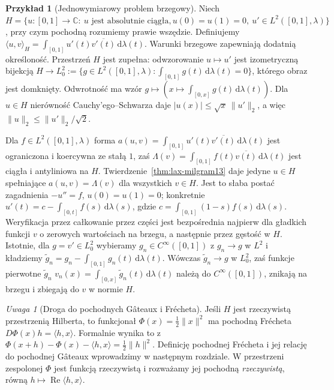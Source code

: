 \documentclass[11pt,a4paper]{article}
\numberwithin{equation}{section}
\theoremstyle{plain}
\theoremstyle{definition}
\newtheorem{przyklad}[twierdzenie]{Przykład}
\theoremstyle{remark}
\newtheorem{uwaga}[twierdzenie]{Uwaga}
\newcommand{\C}{\mathbb C}
\begin{document}
\begin{przyklad}[Jednowymiarowy problem brzegowy]
\label{ex:weak-poisson13}
Niech $H=\{u:[0,1]\to\C:\ u\text{ jest absolutnie ciągła},
u(0)=u(1)=0,\ u'\in L^2([0,1],\lambda)\}$,
przy czym pochodną rozumiemy prawie wszędzie.
Definiujemy $\langle u,v\rangle_H=
\int_{[0,1]}u'(t)\overline{v'(t)}\,\mathrm d\lambda(t)$.
Warunki brzegowe zapewniają dodatnią określoność. Przestrzeń $H$
jest zupełna: odwzorowanie $u\mapsto u'$ jest izometryczną bijekcją
$H\to L^2_0:=\{g\in L^2([0,1],\lambda):
\int_{[0,1]}g(t)\,\mathrm d\lambda(t)=0\}$,
którego obraz jest domknięty. Odwrotność ma wzór
$g\mapsto(x\mapsto\int_{[0,x]}g(t)\,\mathrm d\lambda(t))$.
Dla $u\in H$ nierówność Cauchy'ego--Schwarza daje
$|u(x)|\le\sqrt{x}\,\|u'\|_2$, a więc
$\|u\|_2\le\|u'\|_2/\sqrt2$.

Dla $f\in L^2([0,1],\lambda)$ forma
$a(u,v)=\int_{[0,1]}u'(t)\overline{v'(t)}\,\mathrm d\lambda(t)$
jest ograniczona i koercywna ze stałą $1$, zaś
$\Lambda(v)=\int_{[0,1]}f(t)\overline{v(t)}\,\mathrm d\lambda(t)$
jest ciągła i antyliniowa na $H$.
Twierdzenie~\ref{thm:lax-milgram13} daje jedyne $u\in H$
spełniające $a(u,v)=\Lambda(v)$ dla wszystkich $v\in H$.
Jest to słaba postać zagadnienia $-u''=f$, $u(0)=u(1)=0$;
konkretnie $u'(t)=c-\int_{[0,t]}f(s)\,\mathrm d\lambda(s)$,
gdzie $c=\int_{[0,1]}(1-s)f(s)\,\mathrm d\lambda(s)$.
Weryfikacja przez całkowanie przez części jest bezpośrednia
najpierw dla gładkich funkcji $v$ o zerowych wartościach na brzegu,
a następnie przez gęstość w $H$. Istotnie, dla $g=v'\in L^2_0$
wybieramy $g_n\in C^\infty([0,1])$ z $g_n\to g$ w $L^2$
i kładziemy $\widetilde g_n=g_n-\int_{[0,1]}g_n(t)\,\mathrm d\lambda(t)$.
Wówczas $\widetilde g_n\to g$ w $L^2_0$, zaś funkcje
pierwotne $\widetilde g_n$ $v_n(x)=\int_{[0,x]}\widetilde g_n(t)\,\mathrm d\lambda(t)$
należą do $C^\infty([0,1])$, znikają na brzegu i zbiegają do $v$
w normie $H$.
\end{przyklad}

\begin{uwaga}[Droga do pochodnych Gâteaux i Frécheta]
\label{rem:gateaux-bridge13}
Jeśli $H$ jest rzeczywistą przestrzenią Hilberta, to funkcjonał
$\Phi(x)=\frac12\|x\|^2$ ma pochodną Frécheta
$D\Phi(x)h=\langle h,x\rangle$. Formalnie wynika to z
$\Phi(x+h)-\Phi(x)-\langle h,x\rangle=\frac12\|h\|^2$.
Definicję pochodnej Frécheta i jej relację do pochodnej Gâteaux
wprowadzimy w następnym rozdziale. W przestrzeni zespolonej
$\Phi$ jest funkcją rzeczywistą i rozważamy jej pochodną
\emph{rzeczywistą}, równą $h\mapsto\operatorname{Re}\langle h,x\rangle$.
\end{uwaga}
\end{document}
